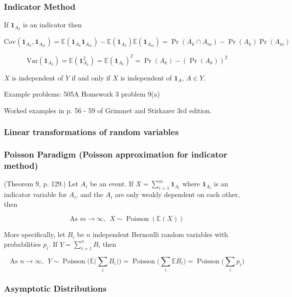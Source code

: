 \documentclass{article}
\newcommand{\E}{\mathbb{E}}
\newcommand{\Var}{\mathrm{Var}}
\newcommand{\Cov}{\mathrm{Cov}}
\begin{document}
\subsubsection{Indicator Method}

If \(\boldsymbol{1}_{A_k}\) is an indicator then

\[
\Cov(\boldsymbol{1}_{A_k}, \boldsymbol{1}_{A_m}) = \E(\boldsymbol{1}_{A_k} \boldsymbol{1}_{A_m}) - \E(\boldsymbol{1}_{A_k}) \E(\boldsymbol{1}_{A_m}) = \Pr(A_k \cap A_m) - \Pr(A_k) \Pr(A_m)
\]

\[
\Var(\boldsymbol{1}_{A_k} ) = \E(\boldsymbol{1}_{A_k} ^2) = \E(\boldsymbol{1}_{A_k} )^2 = \Pr(A_k) - (\Pr(A_k))^2
\]

\(X\) is independent of \(Y\) if and only if \(X\) is independent of \(\boldsymbol{1}_A\), \(A \in Y\).

Example problems: 505A Homework 3 problem 9(a)

Worked examples in p. 56 - 59 of Grimmet and Stirkazer 3rd edition.

\subsubsection{Linear transformations of random variables}

\subsubsection{Poisson Paradigm (Poisson approximation for indicator method)}

(Theorem 9, p. 129.) Let \(A_i\) be an event. If \(X = \sum_{i=1}^m \boldsymbol{1}_{A_i}\) where \(\boldsymbol{1}_{A_i}\) is an indicator variable for \(A_i\), and the \(A_i\) are only weakly dependent on each other, then 

\[
\text{As } m \to \infty, \ \ X \sim \operatorname{Poisson}(\E(X))
\]

More specifically, let \(B_i\) be \(n\) independent Bernoulli random variables with probabilities \(p_i\). If \(Y = \sum_{i=1}^n B_i\) then 

\[
\text{As } n \to \infty, \ \ Y \sim \operatorname{Poisson} \bigg(\E \bigg(\sum_i B_i \bigg) \bigg) = \operatorname{Poisson}\bigg(\sum_i \E B_i \bigg) = \operatorname{Poisson}\bigg(\sum_i p_i \bigg) 
\]

\subsubsection{Asymptotic Distributions}
\end{document}
